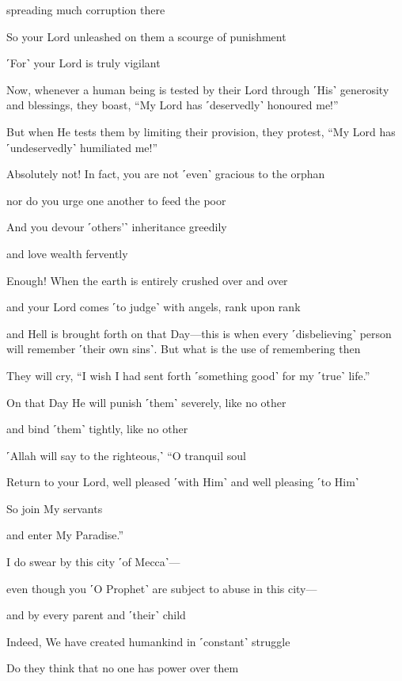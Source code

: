 spreading much corruption there

So your Lord unleashed on them a scourge of punishment

˹For˺ your Lord is truly vigilant

Now, whenever a human being is tested by their Lord through ˹His˺ generosity and blessings, they boast, “My Lord has ˹deservedly˺ honoured me!”

But when He tests them by limiting their provision, they protest, “My Lord has ˹undeservedly˺ humiliated me!”

Absolutely not! In fact, you are not ˹even˺ gracious to the orphan

nor do you urge one another to feed the poor

And you devour ˹others’˺ inheritance greedily

and love wealth fervently

Enough! When the earth is entirely crushed over and over

and your Lord comes ˹to judge˺ with angels, rank upon rank

and Hell is brought forth on that Day—this is when every ˹disbelieving˺ person will remember ˹their own sins˺. But what is the use of remembering then

They will cry, “I wish I had sent forth ˹something good˺ for my ˹true˺ life.”

On that Day He will punish ˹them˺ severely, like no other

and bind ˹them˺ tightly, like no other

˹Allah will say to the righteous,˺ “O tranquil soul

Return to your Lord, well pleased ˹with Him˺ and well pleasing ˹to Him˺

So join My servants

and enter My Paradise.”

I do swear by this city ˹of Mecca˺—

even though you ˹O Prophet˺ are subject to abuse in this city—

and by every parent and ˹their˺ child

Indeed, We have created humankind in ˹constant˺ struggle

Do they think that no one has power over them

